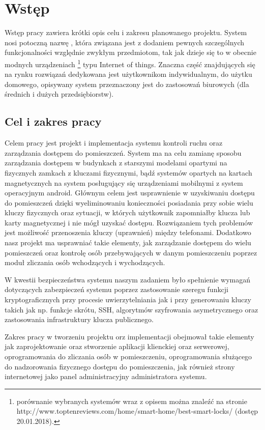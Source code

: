 \newpage\section{Wstęp}\label{sec:wstep}
Wstęp pracy zawiera krótki opis celu i zakresu planowanego projektu. System nosi potoczną nazwę \NazwaSys, która związana jest z dodaniem  pewnych szczególnych funkcjonalności względnie zwykłym przedmiotom, tak jak dzieje się to w obecnie modnych urządzeniach \footnote{porównanie wybranych systemów wraz z opisem można znaleźć na stronie http://www.toptenreviews.com/home/smart-home/best-smart-locks/ (dostęp 20.01.2018).} typu Internet of things. Znaczna część znajdujących się na rynku rozwiązań dedykowana jest użytkownikom indywidualnym, do użytku domowego, opisywany system przeznaczony jest do zastosowań biurowych (dla średnich i dużych przedsiębiorstw).

\subsection{Cel i zakres pracy}

Celem pracy jest projekt i implementacja systemu kontroli ruchu oraz zarządzania dostępem do pomieszczeń. System ma na celu zamianę sposobu zarządzania dostępem w budynkach z starszymi modelami opartymi na fizycznych zamkach z kluczami fizycznymi, bądź systemów opartych na kartach magnetycznych na system posługujący się urządzeniami mobilnymi z system operacyjnym android. Głównym celem jest usprawnienie w uzyskiwaniu dostępu do pomieszczeń dzięki wyeliminowaniu konieczności posiadania przy sobie wielu kluczy fizycznych oraz sytuacji, w których użytkownik zapomniałby klucza lub karty magnetycznej i nie mógł uzyskać dostępu. Rozwiązaniem tych problemów jest możliwość przenoszenia kluczy (uprawnień) między telefonami. Dodatkowo nasz projekt ma usprawniać takie elementy, jak zarządzanie dostępem do wielu pomieszczeń oraz kontrolę osób przebywających w danym pomieszczeniu poprzez moduł zliczania osób wchodzących i wychodzących.
	
W kwestii bezpieczeństwa systemu naszym zadaniem było spełnienie wymagań dotyczących zabezpieczeń systemu poprzez zastosowanie szeregu funkcji kryptograficznych przy procesie uwierzytelniania jak i przy generowaniu kluczy takich jak np. funkcje skrótu, SSH, algorytmów szyfrowania asymetrycznego oraz zastosowania infrastruktury klucza publicznego.

Zakres pracy w tworzeniu projektu orz implementacji obejmował takie elementy jak zaprojektowanie oraz stworzenie aplikacji klienckiej oraz serwerowej, oprogramowania do zliczania osób w pomieszczeniu, oprogramowania służącego do nadzorowania fizycznego dostępu do pomieszczenia, jak również strony internetowej jako panel administracyjny administratora systemu.

